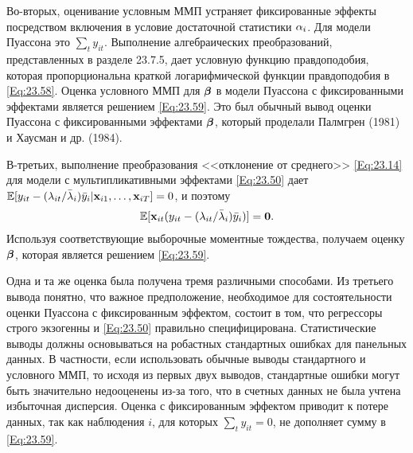 Во-вторых, оценивание условным ММП устраняет фиксированные эффекты посредством включения в условие достаточной статистики $\alpha_i$. Для модели Пуассона это $\sum_t y_{it}$. Выполнение алгебраических преобразований, представленных в разделе 23.7.5, дает условную функцию правдоподобия, которая пропорциональна краткой логарифмической функции правдоподобия в \ref{Eq:23.58}. Оценка условного ММП для $\bm{\beta}$ в модели Пуассона с фиксированными эффектами является решением \ref{Eq:23.59}. Это был обычный вывод оценки Пуассона с фиксированными эффектами $\bm{\beta}$, который проделали  Палмгрен (1981) и Хаусман и др. (1984).

В-третьих, выполнение преобразования <<отклонение от среднего>> \ref{Eq:23.14} для модели с мультипликативными эффектами \ref{Eq:23.50} дает $\mathbb{E} [y_{it} - (\lambda_{it} / \bar{\lambda}_i) \bar{y}_i |\mathbf{x}_{i1}, \dots, \mathbf{x}_{iT}]=0$, и поэтому
\begin{align}
\mathbb{E}[\mathbf{x}_{it}(y_{it}-(\lambda_{it}/\bar{\lambda}_i) \bar{y}_i )] = \mathbf{0}.
\label{Eq:23.60}
\end{align}
Используя соответствующие выборочные моментные тождества, получаем оценку $\bm{\beta}$, которая является решением \ref{Eq:23.59}.

Одна и та же оценка была получена тремя различными способами. Из третьего вывода понятно, что важное предположение, необходимое для состоятельности оценки Пуассона  с фиксированным эффектом, состоит в том, что регрессоры строго экзогенны и \ref{Eq:23.50} правильно специфицирована. Статистические выводы должны основываться на робастных стандартных ошибках для панельных данных. В частности, если использовать обычные выводы стандартного и условного ММП, то исходя из первых двух выводов, стандартные ошибки могут быть значительно недооценены из-за того, что в счетных данных не была учтена избыточная дисперсия. Оценка с фиксированным эффектом приводит к потере данных, так как наблюдения $i$, для которых $\sum_t y_{it} = 0$, не дополняет сумму в \ref{Eq:23.59}.

